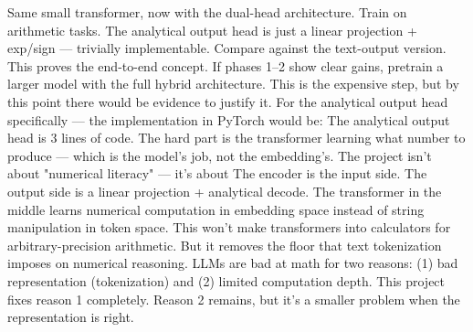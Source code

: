 {} Same small transformer, now with the dual-head architecture. Train on arithmetic tasks. The analytical output head is just a linear projection + exp/sign — trivially implementable. Compare against the text-output version. This proves the end-to-end concept.\markdownRendererParagraphSeparator
{} If phases 1–2 show clear gains, pretrain a larger model with the full hybrid architecture. This is the expensive step, but by this point there would be evidence to justify it.\markdownRendererParagraphSeparator
{}For the analytical output head specifically — the implementation in PyTorch would be:\markdownRendererInterblockSeparator
{}\markdownRendererInterblockSeparator
{}The analytical output head is 3 lines of code. The hard part is the transformer learning what number to produce — which is the model's job, not the embedding's.\markdownRendererInterblockSeparator
{}
\markdownRendererSectionEnd \markdownRendererSectionBegin
{}\markdownRendererInterblockSeparator
{}The project isn't about "numerical literacy" — it's about  The encoder is the input side. The output side is a linear projection + analytical decode. The transformer in the middle learns numerical computation in embedding space instead of string manipulation in token space.\markdownRendererParagraphSeparator
{}This won't make transformers into calculators for arbitrary-precision arithmetic. But it removes the floor that text tokenization imposes on numerical reasoning. LLMs are bad at math for two reasons: (1) bad representation (tokenization) and (2) limited computation depth. This project fixes reason 1 completely. Reason 2 remains, but it's a smaller problem when the representation is right.
\markdownRendererSectionEnd 
\markdownRendererSectionEnd 
\markdownRendererSectionEnd \markdownRendererDocumentEnd